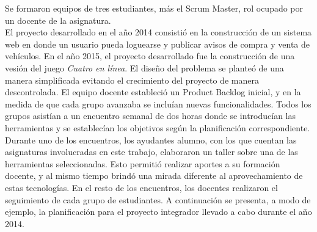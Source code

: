 % 
Se formaron equipos de tres estudiantes, más el Scrum Master\cite{agile}, rol ocupado por un docente de la asignatura.\\
El proyecto desarrollado en el año 2014 consistió en la construcción de un  sistema web en donde un usuario  pueda loguearse y publicar avisos de compra
 y venta de vehículos. En el año 2015, el proyecto desarrollado fue la construcción de una vesión del juego \textit{Cuatro en línea}. 
 El diseño del problema se planteó de una manera simplificada evitando el crecimiento del proyecto de manera descontrolada.
 El equipo docente estableció un Product Backlog inicial, y en la medida de que cada grupo avanzaba se incluían 
 nuevas funcionalidades. Todos los grupos asistían a un encuentro semanal de dos horas donde se introducían las herramientas y se establecían los 
 objetivos según la planificación correspondiente. Durante uno de los encuentros, los ayudantes alumno, con los que cuentan las asignaturas
 involucradas en este trabajo, elaboraron un taller sobre una de las herramientas seleccionadas. Esto permitió realizar aportes a su formación docente, 
 y al mismo tiempo brindó  una mirada diferente al aprovechamiento de estas tecnologías.
 En el resto de los encuentros, los docentes realizaron el seguimiento de cada grupo de estudiantes.
 A continuación se presenta, a modo de ejemplo, la planificación para el proyecto integrador
llevado a cabo durante el año 2014.

